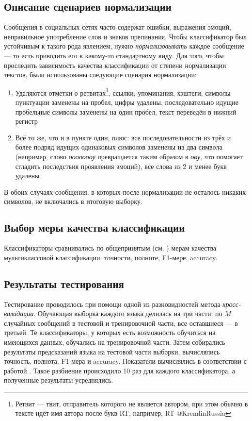 \documentclass[a4paper, 14pt]{article}
\begin{document}
		\subsection{Описание сценариев нормализации}	
		Сообщения в социальных сетях часто содержат ошибки, выражения эмоций, неправильное употребление слов и знаков препинания. Чтобы классификатор
		был устойчивым к такого рода явлением, нужно \textit{нормализовывать}	 каждое сообщение --- то есть приводить его к какому-то стандартному виду.
		Для того, чтобы проследить зависимость качества классификации от степени нормализации текстов, были использованы следующие сценария нормализации:
		\begin{enumerate}
			\item Удаляются отметки о ретвитах\footnote{Ретвит --- твит, отправитель которого не является автором, при этом обычно в тексте идёт имя автора после букв RT, например, RT @KremlinRussia}, ссылки, упоминания, хэштеги, символы пунктуации заменены на пробел, цифры удалены, последовательно идущие пробельные символы заменены на один пробел, текст переведён в нижний регистр
			\item Всё то же, что и в пункте один, плюс: все последовательности из трёх и более подряд идущих одинаковых символов заменены на два символа (например, слово \textit{оооооооу} превращается таким образом в \textit{ооу}, что помогает сгладить последствия проявления эмоций), все слова из 2 и менее букв удалены
		\end{enumerate}
		В обоих случаях сообщения, в которых после нормализации не осталось никаких символов, не включались в итоговую выборку.
		
		
		\subsection{Выбор меры качества классификации}
		Классификаторы сравнивались по общепринятым (см. \cite{multiclass}) мерам качества мультиклассовой классификации: точности, полноте, F1-мере, accuracy.
       
\subsection{Результаты тестирования}
		Тестирование проводилось при помощи одной из разновидностей метода \textit{кросс-валидации}. 
		Обучающая выборка каждого языка делилась на три части: по $M$ случайных сообщений в тестовой и тренировочной части, все оставшиеся --- в третьей.
		Те классификаторы, у которых есть
		возможность обучиться на имеющихся данных, обучались на тренировочной части. Затем собирались результаты
		предсказаний языка на тестовой части выборки, вычислялись точность, полнота, F1-мера и accuracy. Показатели вычислялись в соответствии с работой \cite{multiclass}. Такое разбиение
		происходило 10 раз для каждого классификатора, а полученные результаты усреднялись.
		
\end{document}
